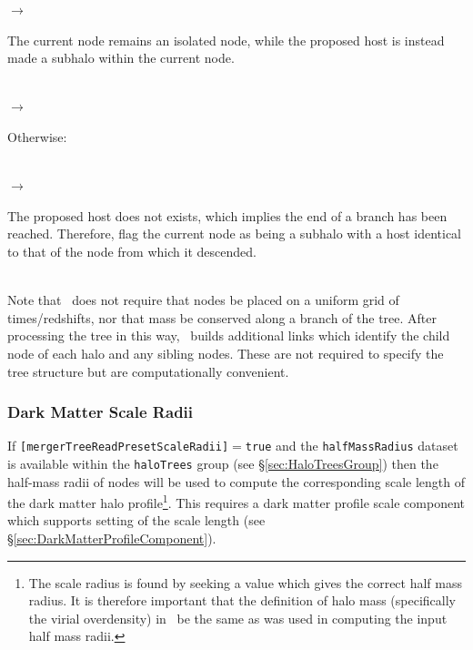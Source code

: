 \noindent\hspace{30mm} $\rightarrow$ \parbox[t]{125mm}{The current node remains an isolated node, while the proposed host is instead made a subhalo within the current node.}\\

\noindent\hspace{20mm} $\rightarrow$ \parbox[t]{135mm}{Otherwise:}\\

\noindent\hspace{25mm} $\rightarrow$ \parbox[t]{130mm}{The proposed host does not exists, which implies the end of a branch has been reached. Therefore, flag the current node as being a subhalo with a host identical to that of the node from which it descended.}\\

Note that \glc\ does not require that nodes be placed on a uniform grid of times/redshifts, nor that mass be conserved along a branch of the tree. After processing the tree in this way, \glc\ builds additional links which identify the child node of each halo and any sibling nodes. These are not required to specify the tree structure but are computationally convenient.

\subsubsection{Dark Matter Scale Radii}

If {\tt [mergerTreeReadPresetScaleRadii]}$=${\tt true} and the {\tt halfMassRadius} dataset is available within the {\tt haloTrees} group (see \S\ref{sec:HaloTreesGroup}) then the half-mass radii of nodes will be used to compute the corresponding scale length of the dark matter halo profile\footnote{The scale radius is found by seeking a value which gives the correct half mass radius. It is therefore important that the definition of halo mass (specifically the virial overdensity) in \protect\glc\ be the same as was used in computing the input half mass radii.}. This requires a dark matter profile scale component which supports setting of the scale length (see \S\ref{sec:DarkMatterProfileComponent}).
